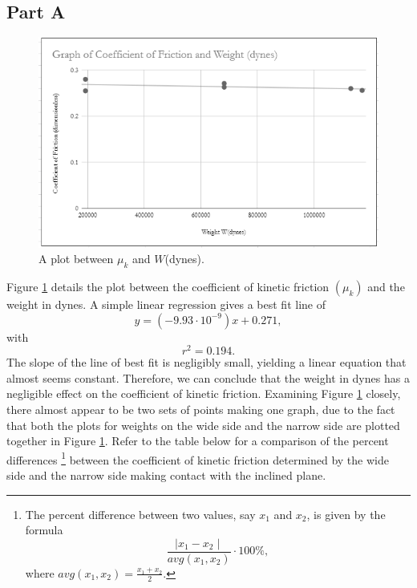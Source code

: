 \documentclass{article}
\theoremstyle{definition}
\begin{document}
\subsection*{Part A}
\begin{figure}
    \includegraphics[width = 1 \columnwidth]{fig2.PNG}
    \caption{A plot between $\mu_k$ and $W$(dynes).}
    \label{fig:2}
\end{figure}
Figure \ref{fig:2} details the plot between the coefficient of kinetic friction $(\mu_k)$
and the weight in dynes. A simple linear regression gives a best fit line of
\begin{equation}
    y = (-9.93 \cdot 10^{-9})x + 0.271,
\end{equation}
with
\begin{equation}
    r^2 = 0.194.
\end{equation}
The slope of the line of best fit is negligibly small, yielding a linear equation that
almost seems constant. Therefore, we can conclude that the weight in dynes has a negligible 
effect on the coefficient of kinetic friction. Examining Figure \ref{fig:2} closely, there almost
appear to be two sets of points making one graph, due to the fact that both the 
plots for weights on the wide side and the narrow side are plotted together in Figure \ref{fig:2}.
Refer to the table below for a comparison of the percent differences \footnote{The percent difference between two values, say $x_1$ and $x_2$, is given by
the formula \begin{equation}
    \frac{\mid x_1 - x_2 \mid}{avg(x_1,x_2)} \cdot 100\%,
\end{equation} where $avg(x_1,x_2) = \frac{x_1+x_2}{2}$.}
 between the coefficient of 
kinetic friction determined by the wide side and the narrow side making contact with the inclined plane. 
\end{document}
